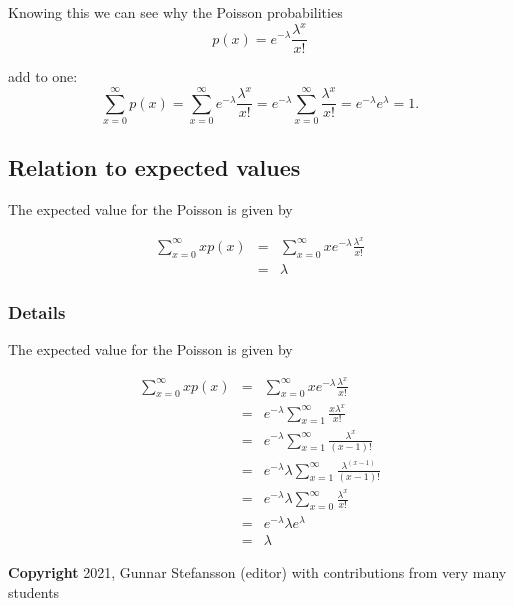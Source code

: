 \documentclass[12pt,a4paper]{article}
\theoremstyle{regla}
\theoremstyle{remark}
\theoremstyle{definition}
\theoremstyle{nonumberbreak}
\begin{document}
 

Knowing this we can see why the Poisson probabilities 
$$p(x)=e^{-\lambda}\frac{\lambda^x}{x!}$$

 
add to one: 
$$\sum_{x=0}^{\infty}p(x)=\sum_{x=0}^{\infty}e^{-\lambda}\frac{\lambda^x}{x!}=e^{-\lambda}\sum_{x=0}^{\infty}\frac{\lambda^x}{x!}=e^{-\lambda}e^{\lambda}=1.$$



\subsection{Relation to expected values}
\begin{fbox}
\begin{minipage}{0.97\textwidth}
The expected value for the Poisson is given by 

\begin{eqnarray*}
\sum_{x=0}^\infty x p(x) &=& \sum_{x=0}^\infty x e^{-\lambda} \frac{\lambda^x}{x!} \\
                         &=& \lambda
\end{eqnarray*}

\end{minipage}
\end{fbox}
\subsubsection{Details}
The expected value for the Poisson is given by 

\begin{eqnarray*}
\sum_{x=0}^\infty x p(x) &=& \sum_{x=0}^\infty x e^{-\lambda} \frac{\lambda^x}{x!} \\
                         &=& e^{-\lambda} \sum_{x=1}^\infty   \frac{x\lambda^x}{x!} \\
                         &=& e^{-\lambda} \sum_{x=1}^\infty   \frac{\lambda^x}{(x-1)!} \\
                         &=& e^{-\lambda} \lambda \sum_{x=1}^\infty   \frac{\lambda^{(x-1)}}{(x-1)!} \\
                         &=& e^{-\lambda} \lambda \sum_{x=0}^\infty   \frac{\lambda^{x}}{x!} \\
                         &=& e^{-\lambda} \lambda  e^{\lambda}\\
                         &=& \lambda
\end{eqnarray*}


{\bf Copyright}
2021, Gunnar Stefansson (editor) with contributions from very many students
\end{document}
